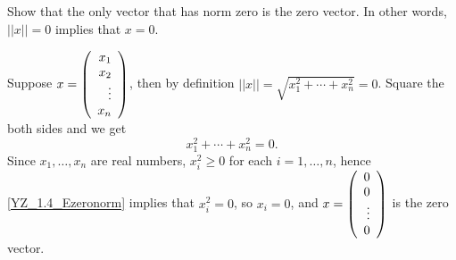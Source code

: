\documentclass{ximera}
\begin{document}
\begin{exercise} \label{YZ_1.4_zeronorm}
Show that the only vector that has norm zero is the zero vector. In other words, $||x||=0$ implies that $x=0$.

\begin{solution}
\soln
 Suppose $x=\left(\begin{array}{rrrrrrrrrrrrrrrrrr} x_1\\x_2\\\vdots\\x_n \end{array}\right)$, then by definition $||x||=\sqrt{x_1^2+\cdots+x_n^2}=0$. Square the both sides and we get 
 \begin{equation}
 x_1^2+\cdots+x_n^2=0. \label{YZ_1.4_Ezeronorm}
 \end{equation}
 Since $x_1,\ldots,x_n$ are real numbers, $x_i^2\ge 0$ for each $i=1,\ldots, n$, hence \eqref{YZ_1.4_Ezeronorm} implies that $x_i^2=0$, so $x_i=0$, and $x=\left(\begin{array}{rrrrrrrrrrrrrrrrrr} 0\\0\\\vdots\\0 \end{array}\right)$ is the zero vector.
\end{solution}


\end{exercise}
\end{document}
